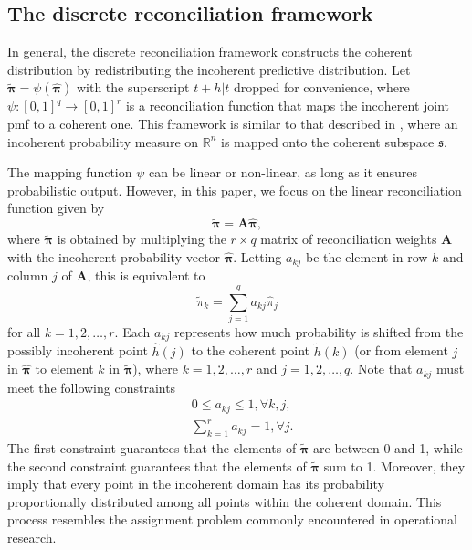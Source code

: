 \documentclass[a4paper,review,12pt,authoryear]{elsarticle}
\newcommand{\bpi}{\bm{\pi}}
\begin{document}
    \subsection{The discrete reconciliation framework}
    
    In general, the discrete reconciliation framework constructs the coherent distribution by redistributing the incoherent predictive distribution. 
    Let $\tilde{\bpi} = \psi(\hat{\bpi})$ with the superscript $t+h|t$ dropped for convenience, where $\psi:[0,1]^q \rightarrow [0,1]^r$ is a reconciliation function that maps the incoherent joint pmf to a coherent one. 
    This framework is similar to that described in \cite{panagiotelisProbabilisticForecastReconciliation2022}, where an incoherent probability measure on $\mathbb{R}^n$ is mapped onto the coherent subspace $\mathfrak{s}$.

    The mapping function $\psi$ can be linear or non-linear, as long as it ensures probabilistic output. 
    However, in this paper, we focus on the linear reconciliation function given by
    \begin{equation}
      \label{eq:framework}
    \tilde{\bpi}=\bm{A}\hat{\bpi},
    \end{equation}
    where $\tilde{\bpi}$ is obtained by multiplying the $r \times q$ matrix of reconciliation weights $\bm{A}$ with the incoherent probability vector $\hat{\bpi}$. Letting $a_{kj}$ be the element in row $k$ and column $j$ of $\bm{A}$, this is equivalent to
    \[
      \tilde{\pi}_k=\sum\limits_{j=1}^q a_{kj}\hat{{\pi}}_j
    \]
    for all $k = 1, 2, \dots, r$. 
    Each $a_{kj}$ represents how much probability is shifted from the possibly incoherent point $\hat{h}(j)$ to the coherent point $\tilde{h}(k)$ (or from element $j$ in $\hat{\bpi}$ to element $k$ in $\tilde{\bpi}$), where  $k = 1, 2, \dots, r$ and  $j = 1, 2, \dots, q$. Note that $a_{kj}$ must meet the following constraints
    \begin{align*}
    &0\leq a_{kj} \leq 1 ,\forall k, j,\\ 
    &\sum\limits_{k=1}^r a_{kj} = 1 ,\forall j. 
    \end{align*}
    The first constraint guarantees that the elements of $\tilde{\bpi}$ are between 0 and 1, while the second constraint guarantees that the elements of $\tilde{\bpi}$ sum to 1.
    Moreover, they imply that every point in the incoherent domain has its probability proportionally distributed among all points  within the coherent domain. 
    This process resembles the assignment problem commonly encountered in operational research.
    
\end{document}
